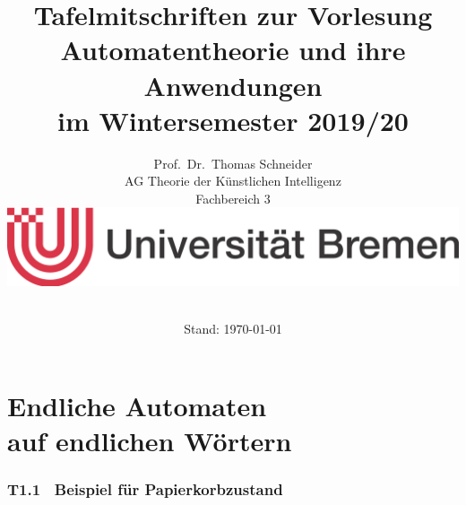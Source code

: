 \documentclass[fontsize=11pt, twoside=false, numbers=autoenddot]{scrbook}
\title{Tafelmitschriften zur Vorlesung \glqq Automatentheorie und ihre Anwendungen\grqq\\ im Wintersemester 2019/20}
\author{%
  Prof.\ Dr.\ Thomas Schneider\\[1pt]
  AG Theorie der Künstlichen Intelligenz \\[1pt]
  Fachbereich 3 \\
  \includegraphics[width=.4\linewidth]{logo_ub.jpg} \\[\baselineskip]~%
}
\date{Stand: \today}
\begin{document}
\maketitle
\tableofcontents

\part[Endliche Automaten auf endlichen Wörtern]{Endliche Automaten \\ auf endlichen Wörtern}

\section*{T1.1~ Beispiel für Papierkorbzustand}
\end{document}
